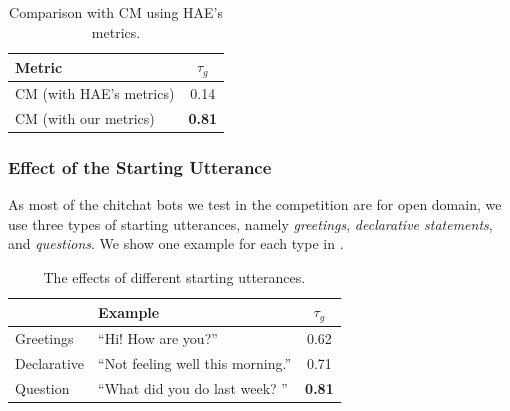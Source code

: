 
\begin{table}[th!]
\centering
\small
\begin{tabular}{lc}
\toprule
Metric  & $\tau_{g}$\\ \midrule
CM (with HAE's metrics) & 0.14 \\
CM (with our metrics)  & \textbf{0.81}  \\
\bottomrule
\end{tabular}
\caption{
Comparison with CM using HAE's metrics.
}
\label{tab:met}
\end{table}


\subsubsection{Effect of the Starting Utterance}

As most of the chitchat bots we test in the competition 
are for open domain, we use three types of starting utterances, 
namely {\em greetings}, {\em declarative statements}, and 
{\em questions}. 
We show one example for each type in 
.

\begin{table}[th!]
\centering
\small
\begin{tabular}{llc}
\toprule
 & Example  & $\tau_{g}$\\ \midrule
Greetings  & ``Hi! How are you?'' & 0.62  \\
Declarative  & ``Not feeling well this morning.'' & 0.71  \\
Question  & ``What did you do last week? '' & \textbf{0.81}  \\
\bottomrule
\end{tabular}
\caption{
The effects of different starting utterances.} 
\label{tab:multi-context}
\end{table}

